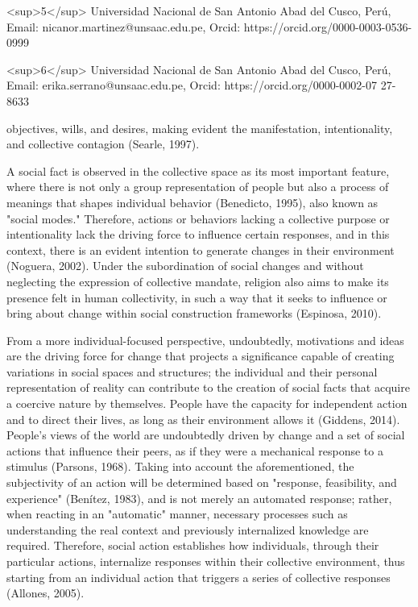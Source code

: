 \documentclass{article}
\begin{document}
<sup>5</sup> Universidad Nacional de San Antonio Abad del Cusco, Perú, Email: nicanor.martinez@unsaac.edu.pe, Orcid: https://orcid.org/0000-0003-0536- 0999

<sup>6</sup> Universidad Nacional de San Antonio Abad del Cusco, Perú, Email: erika.serrano@unsaac.edu.pe, Orcid: https://orcid.org/0000-0002-07 27- 8633

objectives, wills, and desires, making evident the manifestation, intentionality, and collective contagion (Searle, 1997).

A social fact is observed in the collective space as its most important feature, where there is not only a group representation of people but also a process of meanings that shapes individual behavior (Benedicto, 1995), also known as "social modes." Therefore, actions or behaviors lacking a collective purpose or intentionality lack the driving force to influence certain responses, and in this context, there is an evident intention to generate changes in their environment (Noguera, 2002). Under the subordination of social changes and without neglecting the expression of collective mandate, religion also aims to make its presence felt in human collectivity, in such a way that it seeks to influence or bring about change within social construction frameworks (Espinosa, 2010).

From a more individual-focused perspective, undoubtedly, motivations and ideas are the driving force for change that projects a significance capable of creating variations in social spaces and structures; the individual and their personal representation of reality can contribute to the creation of social facts that acquire a coercive nature by themselves. People have the capacity for independent action and to direct their lives, as long as their environment allows it (Giddens, 2014). People's views of the world are undoubtedly driven by change and a set of social actions that influence their peers, as if they were a mechanical response to a stimulus (Parsons, 1968). Taking into account the aforementioned, the subjectivity of an action will be determined based on "response, feasibility, and experience" (Benítez, 1983), and is not merely an automated response; rather, when reacting in an "automatic" manner, necessary processes such as understanding the real context and previously internalized knowledge are required. Therefore, social action establishes how individuals, through their particular actions, internalize responses within their collective environment, thus starting from an individual action that triggers a series of collective responses (Allones, 2005).
\end{document}

